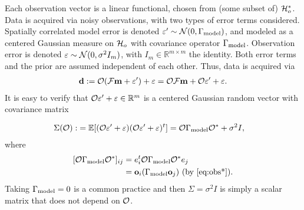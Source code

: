 
Each observation vector is a linear functional, chosen from (some
subset of) $\mathcal{H}_o^{*}$. Data is acquired via noisy observations, with
two types of error terms considered. Spatially correlated model error
is denoted $\varepsilon' \sim \mathcal{N}(0,\Gamma_{\textup{model}})$, and modeled as a centered
Gaussian measure on $\mathcal{H}_o$ with covariance operator
$\Gamma_{\textup{model}}$. Observation error is denoted $\varepsilon \sim \mathcal{N}(0, \sigma^2
I_m)$, with $I_m \in \mathbb{R}^{m \times m}$ the identity. Both error
terms and the prior are assumed independent of each other. Thus, data
is acquired via
\begin{align}\label{eq:inverse problem}
  \data := \obs (\fwd \param + \eps') + \eps = \obs \fwd \param + \obs \eps' + \eps.
\end{align}
It is easy to verify that $\mathcal{O} \varepsilon' + \varepsilon \in \mathbb{R}^m$ is a centered
Gaussian random vector with covariance matrix

\begin{align}\label{eq:Sigma}
  \begin{split}
    \Sigma(\obs) :&= \mathbb{E}[ (\obs \eps' + \eps) (\obs \eps' +
      \eps)^t ]
    = \obs \modcov \obs^* + \sigma^2I , 
  \end{split}
\end{align}
where
\begin{align}\label{eq:modcov explained}
  \begin{split}
    [\obs \modcov \obs^*]_{ij} & = e_i^t \obs \modcov \obs^* e_j \\
    &= \meas_i (\modcov \meas_j) \text{ (by \eqref{eq:obs*})}.
  \end{split}
\end{align}
Taking $\Gamma_{\textup{model}} = 0$ is a common practice
\cite{Tarantola05,Kaipio2006,Vogel02} and then $\Sigma = \sigma^2I$ is
simply a scalar matrix that does not depend on $\mathcal{O}$.

